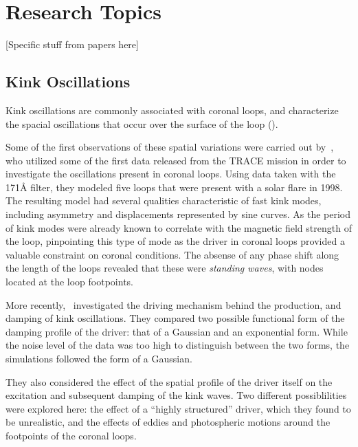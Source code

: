 \documentclass[preprint2]{aastex}
\begin{document}
\section{Research Topics}\label{topics}
[Specific stuff from papers here]

\subsection{Kink Oscillations}
Kink oscillations are commonly associated with coronal loops, and
characterize the spacial oscillations that occur over the surface of
the loop (\cite{Nak}).



Some of the first observations of these spatial variations
were carried out by~\cite{kink_1},
who utilized some of the first data released from the TRACE mission in
order to investigate the oscillations present in coronal loops.
Using data taken with the 171\AA{} filter, they modeled five loops that
were present with a solar flare in 1998.
The resulting model had several qualities characteristic of
fast kink modes, including asymmetry
and
displacements represented by sine curves.
As the period of kink modes were already known to correlate
with the magnetic field strength of the loop, pinpointing this
type of mode as the driver in coronal loops provided a valuable
constraint on coronal conditions.
The absense of any phase
shift along the length of the loops revealed that these were
\emph{standing waves}, with nodes located at the loop footpoints.

More recently,~\cite{kink_2} investigated the driving mechanism
behind the production, and damping of kink oscillations.
They compared two possible functional form of the damping profile
of the driver: that of a Gaussian and an exponential form.
While the noise level of the data was too high to distinguish
between the two forms, the simulations followed the form of a
Gaussian.

They also considered the effect of the spatial profile of the driver
itself on the excitation and subsequent damping of the kink
waves. Two different possiblilities were explored here:
the effect of a ``highly structured'' driver, which they
found to be unrealistic, and the effects of eddies and photospheric
motions around the footpoints of the coronal loops.
\end{document}
